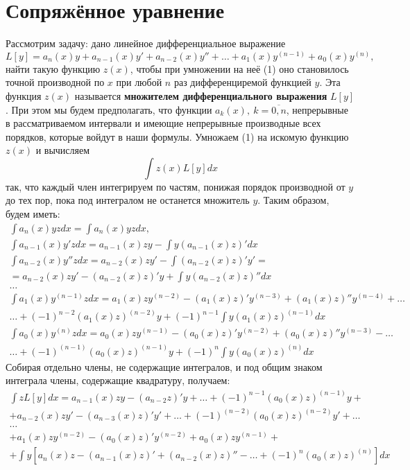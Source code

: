 \section{Сопряжённое уравнение}
Рассмотрим задачу: дано линейное дифференциальное выражение
\[
	L[y] = a_n (x) y + a_{n-1} (x) y' + a_{n-2} (x) y'' + \dots + a_1 (x) y^{(n-1)} + a_0 (x) y^{(n)}, \tag{1}
\]
найти такую функцию $z(x)$, чтобы при умножении на неё (1) оно становилось точной производной по $x$ при любой $n$ раз дифференциремой функцией $y$. Эта функция $z(x)$ называется \textbf{множителем дифференциального выражения} $L[y]$. При этом мы будем предполагать, что функции $a_k(x), ~ k = \overline{0,n}$, непрерывные в рассматриваемом интервали и имеющие непрерывные производные всех порядков, которые войдут в наши формулы. Умножаем (1) на искомую функцию $z(x)$ и вычисляем
\[
	\int z(x) L[y] dx
\]
так, что каждый член интегрируем по частям, понижая порядок производной от $y$ до тех пор, пока под интегралом не останется множитель $y$. Таким образом, будем иметь:
\[
	\begin{aligned}
		\int a_n (x) yzdx = \int a_n (x) yzdx, \\
		\int a_{n-1} (x) y'zdx = a_{n-1} (x) zy - \int y(a_{n-1} (x)z)'dx \\
		\int a_{n-2} (x) y''zdx = a_{n-2}(x) zy' - \int (a_{n-2} (x)z)' y' = \\
		= a_{n-2} (x) zy' - (a_{n-2} (x) z)'y + \int y(a_{n-2}(x)z)''dx \\
		\dots \\
		\int a_1 (x) y^{(n-1)}zdx = a_1 (x)zy^{(n-2)} - (a_1(x)z)'y^{(n-3)}+(a_1(x)z)''y^{(n-4)} + \dots \\
		\dots + (-1)^{n-2} (a_1(x)z)^{(n-2)}y + (-1)^{n-1} \int y(a_1(x)z)^{(n-1)}dx \\
		\int a_0(x) y^{(n)}zdx = a_0(x)zy^{(n-1)} - (a_0(x)z)'y^{(n-2)} + (a_0(x)z)''y^{(n-3)} - \dots \\
		\dots + (-1)^{(n-1)} (a_0(x)z)^{(n-1)}y + (-1)^n \int y(a_0(x)z)^{(n)}dx
	\end{aligned}
\]
Собирая отдельно члены, не содержащие интегралов, и под общим знаком интеграла члены, содержащие квадратуру, получаем:
\[
	\begin{aligned}
		\int zL[y]dx = a_{n-1} (x) zy - (a_{n-2}z)'y + \dots + (-1)^{n-1} (a_0(x)z)^{(n-1)}y + \\
		+ a_{n-2}(x)zy'-(a_{n-3}(x)z)'y' + \dots + (-1)^{(n-2)}(a_0(x)z)^{(n-2)}y' + \dots \\
		\dots \\
		+ a_1(x)zy^{(n-2)} - (a_0(x)z)'y^{(n-2)} + a_0(x) zy^{(n-1)} + \\
		+ \int y\left[ a_n(x)z - (a_{n-1}(x)z)' + (a_{n-2}(x)z)''- \dots + (-1)^n (a_0(x)z)^{(n)}\right]dx
	\end{aligned}
\]
